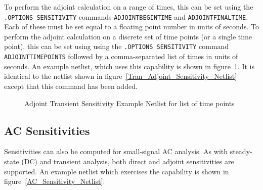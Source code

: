 To perform the adjoint calculation on a range of times, this can be set using 
the \texttt{.OPTIONS SENSITIVITY} commands \texttt{ADJOINTBEGINTIME} and 
\texttt{ADJOINTFINALTIME}.  Each of these must be set equal to a floating point
number in units of seconds.  To perform the adjoint calculation on a discrete 
set of time points (or a single time point), this can be set using using the 
\texttt{.OPTIONS SENSITIVITY} command \texttt{ADJOINTTIMEPOINTS} followed by a 
comma-separated list of times in units of seconds.  An example netlist, which 
uses this capability is shown in figure~\ref{Tran_Adjoint_Sensitivity_Netlist2}.  
It is identical to the netlist shown in figure~\ref{Tran_Adjoint_Sensitivity_Netlist} 
except that this command has been added.
\begin{figure}[htbp]
  \begin{centering}
\caption[Adjoint Transient Sensitivity Example Netlist for list of time points]
{Adjoint Transient Sensitivity Example Netlist for list of time points\label{Tran_Adjoint_Sensitivity_Netlist2} }
\end{centering}
\end{figure}

\clearpage
\subsection{AC Sensitivities}
Sensitivities can also be computed for small-signal AC analysis.  As
with steady-state (DC) and transient analysis, both direct and adjoint
sensitivities are supported.  An example netlist which exercises the
capability is shown in figure~\ref{AC_Sensitivity_Netlist}.

